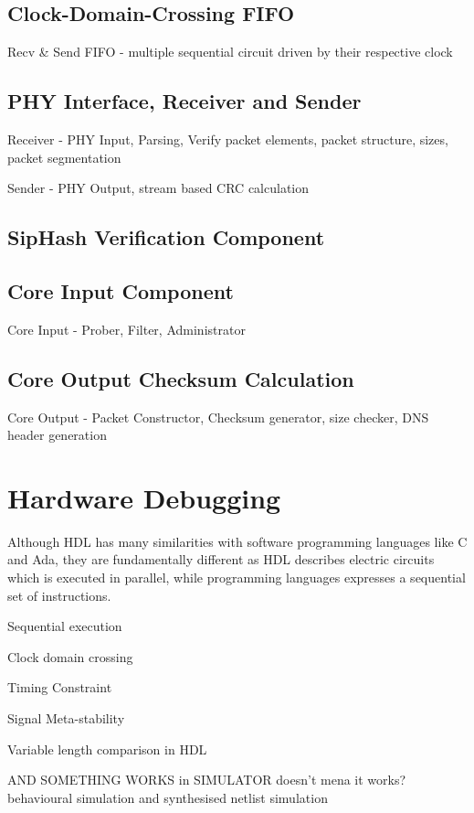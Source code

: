 \documentclass[a4paper]{report}
\begin{document}
\subsection{Clock-Domain-Crossing FIFO}
Recv \& Send FIFO - multiple sequential circuit driven by their respective clock

\subsection{PHY Interface, Receiver and Sender}
Receiver - PHY Input, Parsing, Verify packet elements, packet structure, sizes, packet segmentation

Sender - PHY Output, stream based CRC calculation

\subsection{SipHash Verification Component}

\subsection{Core Input Component}
Core Input - Prober, Filter, Administrator

\subsection{Core Output Checksum Calculation }
Core Output - Packet Constructor, Checksum generator, size checker, DNS header generation


\section{Hardware Debugging}
\label{section:implementation-hardware-debugging}

Although HDL has many similarities with software programming languages like C and Ada, they are fundamentally different as HDL describes electric circuits which is executed in parallel, while programming languages expresses a sequential set of instructions.

Sequential execution

Clock domain crossing

Timing Constraint

Signal Meta-stability

Variable length comparison in HDL

AND SOMETHING WORKS in SIMULATOR doesn't mena it works?
behavioural simulation and synthesised netlist simulation
\end{document}
